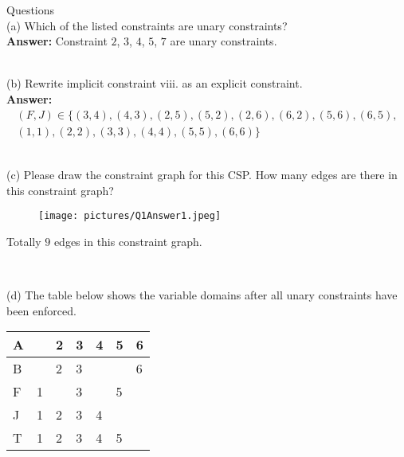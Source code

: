 \documentclass{article}
\begin{document}
\noindent Questions \\

\noindent (a) Which of the listed constraints are unary constraints? \\

\textbf{Answer:} Constraint $2$, $3$, $4$, $5$, $7$ are unary constraints.

~\\ 

\noindent (b) Rewrite implicit constraint viii. as an explicit constraint. \\

\textbf{Answer:} 
\begin{equation}\tag{$1$}
    \begin{aligned}
        (F, J) \in \{(3, 4), (4, 3), (2, 5), (5, 2), (2, 6), (6, 2), (5, 6), (6, 5),\\ 
        (1, 1), (2, 2), (3, 3), (4, 4), (5, 5), (6, 6)\}
    \end{aligned}
\end{equation}

~\\

\noindent (c) Please draw the constraint graph for this CSP. How many edges are there in this constraint graph?

\begin{figure}[h]
\centering
\texttt{[image: pictures/Q1Answer1.jpeg]}
\end{figure}

Totally $9$ edges in this constraint graph.

~\\

\newpage

\noindent (d) The table below shows the variable domains after all unary constraints have been enforced.

\renewcommand\arraystretch{2}
\begin{table}[tbh!]
\begin{center}
    \begin{tabular}{|p{1cm}| p{1cm}| p{1cm} | p{1cm}| p{1cm}| p{1cm}| p{1cm}|}
\hline
    A &  & 2 & 3 & 4 & 5 & 6  \\ \hline
    B &  & 2 & 3 &   &   & 6  \\ \hline
    F & 1 &  & 3 &   & 5 &   \\ \hline
    J & 1 & 2 & 3 & 4  &  &   \\ \hline
    T & 1 & 2 & 3 & 4  & 5 &   \\ \hline
\end{tabular}
\end{center}
\end{table}
\end{document}

